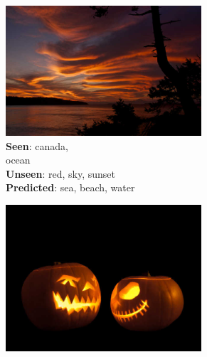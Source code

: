 \begin{figure}
\begin{subfigure}[b]{0.17\textwidth}
                \label{fig:negex2}
        \end{subfigure}%
	\; \vline
        \; %
        \begin{subfigure}[b]{0.16\textwidth}
                \includegraphics[width=0.8\textwidth]{TagTree/Flickrimg/bf51a02f-baa1-3861-a300-12b5f654c456.jpeg}
                \caption{\textbf{Seen}: canada, \\ ocean \\ \textbf{Unseen}: red, sky, sunset \\ \textbf{Predicted}: sea, beach, water }
                \label{fig:negex3}
        \end{subfigure}%
	\; \vline
        \; %
        \begin{subfigure}[b]{0.17\textwidth}
                \includegraphics[width=0.8\textwidth]{TagTree/Flickrimg/b339e52a-b87e-347a-8ba8-12502fc11443.jpeg}

\end{subfigure}
\end{figure}
